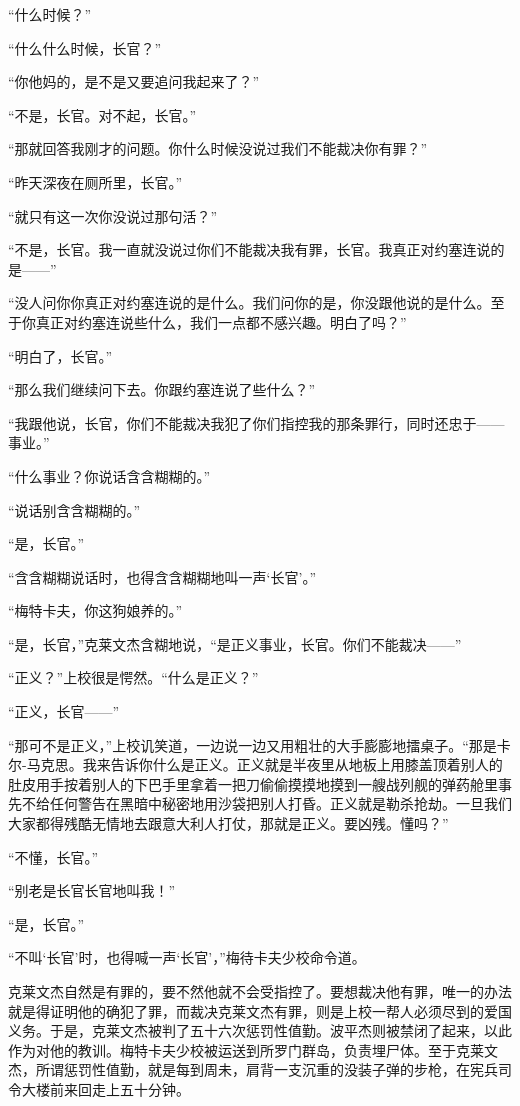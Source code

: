     “什么时候？”

    “什么什么时候，长官？”

    “你他妈的，是不是又要追问我起来了？”

    “不是，长官。对不起，长官。”

    “那就回答我刚才的问题。你什么时候没说过我们不能裁决你有罪？”

    “昨天深夜在厕所里，长官。”

    “就只有这一次你没说过那句活？”

    “不是，长官。我一直就没说过你们不能裁决我有罪，长官。我真正对约塞连说的是——”

    “没人问你你真正对约塞连说的是什么。我们问你的是，你没跟他说的是什么。至于你真正对约塞连说些什么，我们一点都不感兴趣。明白了吗？”

    “明白了，长官。”

    “那么我们继续问下去。你跟约塞连说了些什么？”

    “我跟他说，长官，你们不能裁决我犯了你们指控我的那条罪行，同时还忠于——事业。”

    “什么事业？你说话含含糊糊的。”

    “说话别含含糊糊的。”

    “是，长官。”

    “含含糊糊说话时，也得含含糊糊地叫一声‘长官’。”

    “梅特卡夫，你这狗娘养的。”

    “是，长官，”克莱文杰含糊地说，“是正义事业，长官。你们不能裁决——”

    “正义？”上校很是愕然。“什么是正义？”

    “正义，长官——”

    “那可不是正义，”上校讥笑道，一边说一边又用粗壮的大手膨膨地擂桌子。“那是卡尔-马克思。我来告诉你什么是正义。正义就是半夜里从地板上用膝盖顶着别人的肚皮用手按着别人的下巴手里拿着一把刀偷偷摸摸地摸到一艘战列舰的弹药舱里事先不给任何警告在黑暗中秘密地用沙袋把别人打昏。正义就是勒杀抢劫。一旦我们大家都得残酷无情地去跟意大利人打仗，那就是正义。要凶残。懂吗？”

    “不懂，长官。”

    “别老是长官长官地叫我！”

    “是，长官。”

    “不叫‘长官’时，也得喊一声‘长官’，”梅待卡夫少校命令道。

    克莱文杰自然是有罪的，要不然他就不会受指控了。要想裁决他有罪，唯一的办法就是得证明他的确犯了罪，而裁决克莱文杰有罪，则是上校一帮人必须尽到的爱国义务。于是，克莱文杰被判了五十六次惩罚性值勤。波平杰则被禁闭了起来，以此作为对他的教训。梅特卡夫少校被运送到所罗门群岛，负责埋尸体。至于克莱文杰，所谓惩罚性值勤，就是每到周未，肩背一支沉重的没装子弹的步枪，在宪兵司令大楼前来回走上五十分钟。

